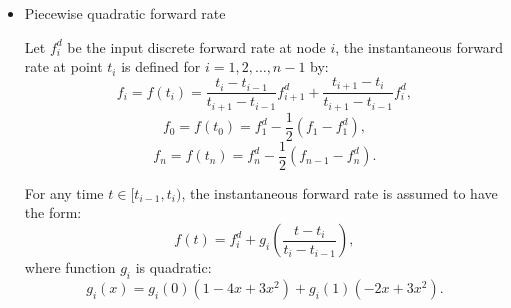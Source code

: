 \begin{itemize}
  \item Piecewise quadratic forward rate

  Let $f_i^d$ be the input discrete forward rate at node $i$, the instantaneous
  forward rate at point $t_i$ is defined for $i=1,2,\dots,n-1$ by:
  \begin{equation}
    f_i = f(t_i) = \frac{t_i-t_{i-1}}{t_{i+1}-t_{i-1}} f^d_{i+1}
                   + \frac{t_{i+1}-t_{i}}{t_{i+1}-t_{i-1}} f^d_{i},
  \end{equation}
  \begin{equation}
    f_0 = f(t_0) = f_1^d - \frac{1}{2}(f_1 - f_1^d),
  \end{equation}
  \begin{equation}
    f_n = f(t_n) = f_n^d - \frac{1}{2}(f_{n-1} - f_n^d).
  \end{equation}

  For any time $t\in [t_{i-1},t_i)$, the instantaneous forward rate is assumed
  to have the form:
  \begin{equation}
    f(t) = f_i^d + g_i\left( \frac{t-t_i}{t_i-t_{i-1}} \right),
  \end{equation}
  where function $g_i$ is quadratic:
  \[
	  g_i(x) = g_i(0)(1- 4x + 3x^2) + g_i(1)(-2x+3x^2).
  \]




\end{itemize}
